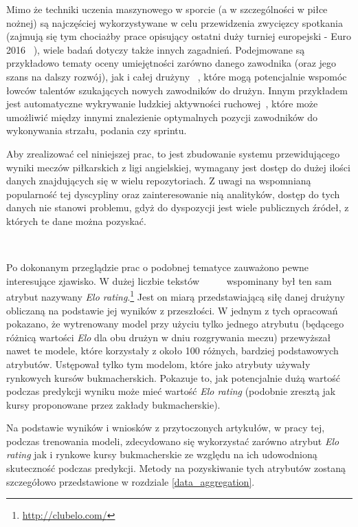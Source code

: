 Mimo że techniki uczenia maszynowego w sporcie (a w szczególności w piłce nożnej) są najczęściej wykorzystywane w celu przewidzenia zwycięzcy spotkania (zajmują się tym chociażby prace opisujący ostatni duży turniej europejski - Euro 2016~\cite{Euro2016-1} \cite{Euro2016-2} \cite{Euro2016-3}), wiele badań dotyczy także innych zagadnień. Podejmowane są przykładowo tematy oceny umiejętności zarówno danego zawodnika (oraz jego szans na dalszy rozwój), jak i całej drużyny~\cite{ml_soccer_analytics} \cite{soccer_players_skill}, które mogą potencjalnie wspomóc łowców talentów szukających nowych zawodników do drużyn. Innym przykładem jest automatyczne wykrywanie ludzkiej aktywności ruchowej~\cite{activity_recignition}, które może umożliwić między innymi znalezienie optymalnych pozycji zawodników do wykonywania strzału, podania czy sprintu.

Aby zrealizować cel niniejszej prac, to jest zbudowanie systemu przewidującego wyniki meczów piłkarskich z ligi angielskiej, wymagany jest dostęp do dużej ilości danych znajdujących się w wielu repozytoriach. Z uwagi na wspomnianą popularność tej dyscypliny oraz zainteresowanie nią analityków, dostęp do tych danych nie stanowi problemu, gdyż do dyspozycji jest wiele publicznych źródeł, z których te dane można pozyskać.

~

Po dokonanym przeglądzie prac o podobnej tematyce zauważono pewne interesujące zjawisko. W dużej liczbie tekstów~\cite{WorldCup-2018}~\cite{EloRating-1}~\cite{Euro2016-1}~\cite{Euro2016-2}~\cite{Euro2016-3} wspominany był ten sam atrybut nazywany \emph{Elo rating}.\footnote{\url{http://clubelo.com/}} Jest on  miarą przedstawiającą siłę danej drużyny obliczaną na podstawie jej wyników z przeszłości. W jednym z tych opracowań~\cite{EloRating-1} pokazano, że wytrenowany model przy użyciu tylko jednego atrybutu (będącego różnicą wartości \emph{Elo} dla obu drużyn w dniu rozgrywania meczu) przewyższał nawet te modele, które korzystały z około 100 różnych, bardziej podstawowych atrybutów. Ustępował tylko tym modelom, które jako atrybuty używały rynkowych kursów bukmacherskich. Pokazuje to, jak potencjalnie dużą wartość podczas predykcji wyniku może mieć wartość \emph{Elo rating} (podobnie zresztą jak kursy proponowane przez zakłady bukmacherskie).

Na podstawie wyników i wniosków z przytoczonych artykułów, w pracy tej, podczas trenowania modeli, zdecydowano się wykorzystać zarówno atrybut \emph{Elo rating} jak i rynkowe kursy bukmacherskie ze względu na ich udowodnioną skuteczność podczas predykcji. Metody na pozyskiwanie tych atrybutów zostaną szczegółowo przedstawione w rozdziale \ref{data_aggregation}.

